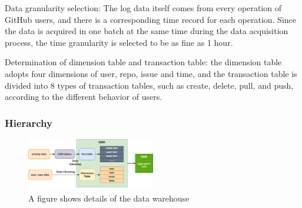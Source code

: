Data granularity selection: The log data itself comes from every operation of GitHub users, and there is a corresponding time record for each operation. Since the data is acquired in one batch at the same time during the data acquisition process, the time granularity is selected to be as fine as 1 hour.

Determination of dimension table and transaction table: the dimension table adopts four dimensions of user, repo, issue and time, and the transaction table is divided into 8 types of transaction tables, such as create, delete, pull, and push, according to the different behavior of users.




\subsubsection{Hierarchy}


\begin{figure}[H]
    \centering
    \includegraphics[width=0.5\textwidth]{./pic/warehouse.png}
    \caption{A figure shows details of the data warehouse}
    \label{fig:}
\end{figure}

